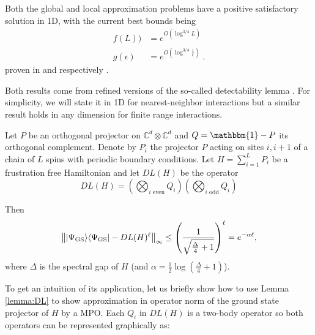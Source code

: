 \documentclass[smallextended]{svjour3}
\renewcommand{\1}{\mathbbm{1}}
\newcommand{\C}{\mathbb{C}}
\newcommand{\ket} [1] {\vert #1 \rangle}
\newcommand{\bra} [1] {\langle #1 \vert}
\begin{document}
Both the global and local approximation problems have a positive satisfactory solution in 1D, with the current best bounds being
\begin{align}\label{eq:bounds-approx}
    f(L))       &= e^{O(\log^{3/4}L)}\\
    g(\epsilon) &= e^{O(\log^{3/4}\frac{1}{\epsilon})} \nonumber \; .
\end{align}
proven in \cite{Arad2013} and \cite{Huang} respectively .

Both results come from refined versions of the so-called detectability lemma \cite{Aharonov,Anshu}. For simplicity, we will state it in 1D for nearest-neighbor interactions but a similar result holds in any dimension for finite range interactions.

\begin{lemma}\label{lemma:DL}
    Let $P$ be an orthogonal  projector on $\C^d\otimes \C^d$ and $Q=\1-P$ its orthogonal complement. Denote by $P_i$ the projector $P$ acting on sites $i,i+1$ of a chain of $L$ spins with periodic boundary conditions. Let $H=\sum_{i=1}^L P_i$ be a frustration free Hamiltonian and let
    $DL(H)$ be the operator
    $$DL(H)=\left(\bigotimes_{i\text{ even}} Q_i\right)\left(\bigotimes_{i\text{ odd}} Q_i\right)$$

    Then $$\left\| \ket{\Psi_{\rm GS}}\bra{\Psi_{\rm GS}} - DL(H)^\ell\right\|_\infty\le \left(\frac{1}{\sqrt{\frac{\Delta}{4}+1}} \right)^\ell= e^{-\alpha\ell},$$
    where $\Delta$ is the spectral gap of $H$ (and $\alpha=\frac{1}{2}\log(\frac{\Delta}{4}+1)$).
\end{lemma}



To get an intuition of its application, let us briefly show how to use Lemma \ref{lemma:DL} to show approximation in operator norm of the ground state projector of $H$ by a MPO. Each $Q_i$ in $DL(H)$ is a two-body operator so both operators can be represented graphically as:
\end{document}
